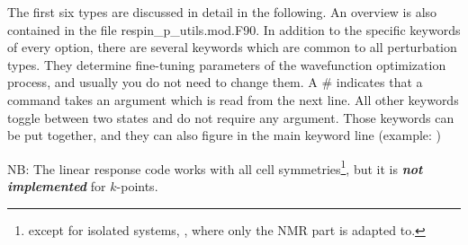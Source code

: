 \documentclass[twoside,10pt,titlepage,a4paper]{article}
\begin{document}
The first six types are discussed in detail in the following. An overview is also
contained in the file respin\_p\_utils.mod.F90. In addition to the
specific keywords of every option, there are several keywords which
are common to all perturbation types. They determine fine-tuning
parameters of the wavefunction optimization process, and usually you
do not need to change them. A \# indicates that a command takes an
argument which is read from the next line. All other keywords toggle
between two states and do not require any argument. Those keywords can
be put together, and they can also figure in the main keyword line
(example: )


NB: The linear response code works with all cell symmetries\footnote
{except for isolated systems, , where only the NMR
part is adapted to.}, but it is \textbf{\textsl{not implemented}} for
$k$-points.
\end{document}
